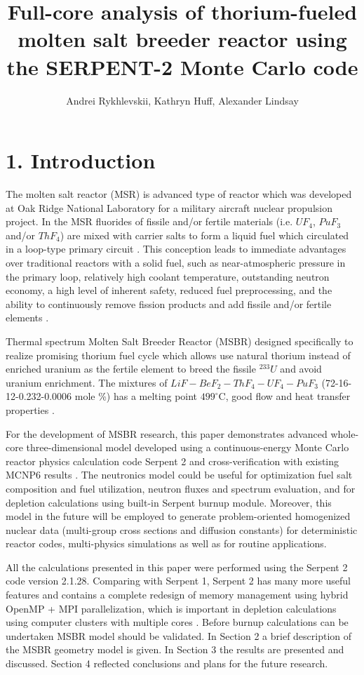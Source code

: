 \documentclass{anstrans}
\title{Full-core analysis of thorium-fueled molten salt breeder reactor using the SERPENT-2 Monte Carlo code}
\author{Andrei Rykhlevskii, Kathryn Huff, Alexander Lindsay}
\institute{
Department of Nuclear, Plasma, and Radiological Engineering, University of Illinois at Urbana-Champaign \break
Urbana, IL
}
\begin{document}
\section{1. Introduction}
The molten salt reactor (MSR) is advanced type of reactor which was  developed at Oak Ridge National Laboratory for a military aircraft nuclear propulsion project. In the MSR fluorides of fissile and/or fertile materials (i.e. $UF_4$, $PuF_3$ and/or $ThF_4$) are mixed with carrier salts to form a liquid fuel which circulated in a loop-type primary circuit \cite{haubenreich_experience_1970}. This conception leads to immediate advantages over traditional reactors with a solid fuel, such as near-atmospheric pressure in the primary loop, relatively high coolant temperature, outstanding neutron economy, a high level of inherent safety, reduced fuel preprocessing, and the ability to continuously remove fission products and add fissile and/or fertile elements \cite{leblanc_molten_2010}. 

Thermal spectrum Molten Salt Breeder Reactor (MSBR) designed specifically to realize promising thorium fuel cycle which allows use natural thorium instead of enriched uranium as the fertile element to breed the fissile $^{233}U$ and avoid uranium enrichment. The mixtures of $LiF-BeF_2-ThF_4-UF_4-PuF_3$ (72-16-12-0.232-0.0006 mole \%) has a melting point $499^\circ$C, good flow and heat transfer properties \cite{robertson_conceptual_1971}.

For the development of MSBR research, this paper demonstrates advanced whole-core three-dimensional model developed using a continuous-energy Monte Carlo reactor physics calculation code Serpent 2 and cross-verification with existing MCNP6 results \cite{park_whole_2015,leppanen_serpent_2012}. The neutronics model could be useful for optimization fuel salt composition and fuel utilization, neutron fluxes and spectrum evaluation, and for depletion calculations using built-in Serpent burnup module. Moreover, this model in the future will be employed to generate problem-oriented homogenized nuclear data (multi-group cross sections and diffusion constants) for deterministic reactor codes, multi-physics simulations \cite{fridman_use_2011,valtavirta_coupled_2017} as well as for routine applications.

All the calculations presented in this paper were performed using the Serpent 2 code version 2.1.28. Comparing with Serpent 1, Serpent 2 has many more useful features and contains a complete redesign of memory management using hybrid OpenMP + MPI parallelization, which is important in depletion calculations using computer clusters with multiple cores \cite{leppanen_serpent_2015}. Before burnup calculations can be undertaken MSBR model should be validated. In Section 2 a brief description of the MSBR geometry model is given. In Section 3 the results are presented and discussed. Section 4 reflected conclusions and plans for the future research.
\end{document}
